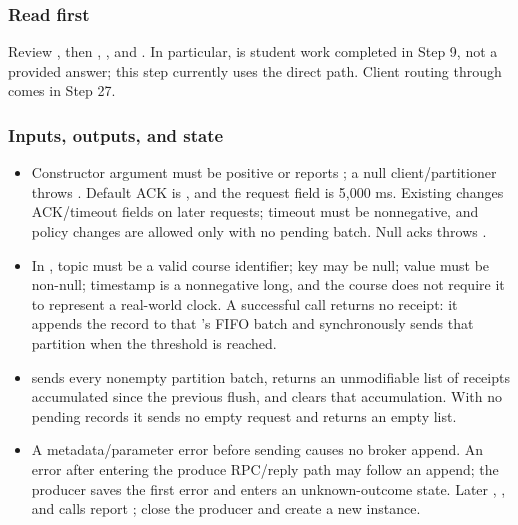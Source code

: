 \subsubsection*{Read first}
Review , then , , and . In particular,  is student work completed in Step 9, not a provided answer; this step currently uses the direct  path. Client routing through  comes in Step 27.
\subsubsection*{Inputs, outputs, and state}
\begin{itemize}
\item Constructor argument  must be positive or reports ; a null client/partitioner throws . Default ACK is , and the request field  is 5,000 ms. Existing  changes ACK/timeout fields on later requests; timeout must be nonnegative, and policy changes are allowed only with no pending batch. Null acks throws .
\item In , topic must be a valid course identifier; key may be null; value must be non-null; timestamp is a nonnegative long, and the course does not require it to represent a real-world clock. A successful call returns no receipt: it appends the record to that 's FIFO batch and synchronously sends that partition when the threshold is reached.
\item {} sends every nonempty partition batch, returns an unmodifiable list of receipts accumulated since the previous flush, and clears that accumulation. With no pending records it sends no empty request and returns an empty list.
\item A metadata/parameter error before sending causes no broker append. An error after entering the produce RPC/reply path may follow an append; the producer saves the first error and enters an unknown-outcome state. Later , , and  calls report ; close the producer and create a new instance.
\end{itemize}
